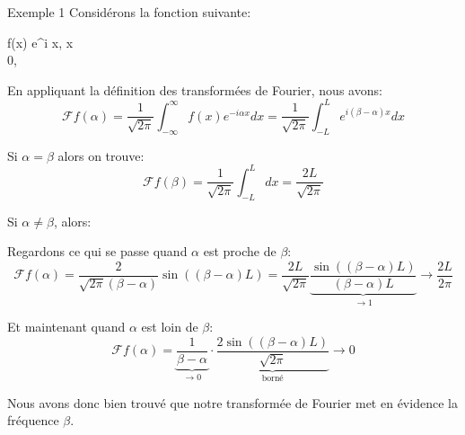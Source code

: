 \documentclass[a4paper]{article}
\begin{document}
\begin{parag}{Exemple 1}
    Considérons la fonction suivante:
    \begin{functionbypart}{f\left(x\right)}
        e^{i \beta x}, \mathspace {} x \in \left[-L, L\right]  \\
        0, \mathspace {}
    \end{functionbypart}

    En appliquant la définition des transformées de Fourier, nous avons: 
    \[\mathcal{F} f\left(\alpha\right) = \frac{1}{\sqrt{2\pi}} \int_{-\infty}^{\infty} f\left(x\right) e^{-i\alpha x} dx = \frac{1}{\sqrt{2\pi}} \int_{-L}^{L} e^{i \left(\beta - \alpha\right)x}dx\]
    
    Si $\alpha = \beta$ alors on trouve: 
    \[\mathcal{F} f\left(\beta\right) = \frac{1}{\sqrt{2\pi}} \int_{-L}^{L} dx = \frac{2L}{\sqrt{2\pi}}\]
    
    Si $\alpha \neq \beta$, alors: 

    Regardons ce qui se passe quand $\alpha$ est proche de $\beta$: 
    \[\mathcal{F} f \left(\alpha\right) = \frac{2}{\sqrt{2\pi} \left(\beta -\alpha\right)} \sin\left(\left(\beta -\alpha\right)L\right) = \frac{2L}{\sqrt{2\pi}} \underbrace{\frac{\sin\left(\left(\beta - \alpha\right)L\right)}{\left(\beta - \alpha\right) L}}_{\to 1} \to \frac{2L}{2\pi}\]
    
    Et maintenant quand $\alpha$ est loin de $\beta$:
    \[\mathcal{F} f\left(\alpha\right) = \underbrace{\frac{1}{\beta - \alpha}}_{\to 0} \cdot  \underbrace{\frac{2 \sin\left(\left(\beta - \alpha\right)L\right)}{\sqrt{2\pi}}}_{\text{borné}} \to 0\]

    Nous avons donc bien trouvé que notre transformée de Fourier met en évidence la fréquence $\beta$.
\end{parag}
\end{document}
